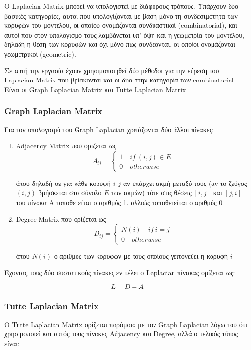 \documentclass[draft]{article}
\begin{document}
Ο Laplacian Matrix μπορεί να υπολογιστεί με διάφορους τρόπους.
Υπάρχουν δύο βασικές κατηγορίες,
αυτοί που υπολογίζονται με βάση μόνο τη συνδεσιμότητα των κορυφών του μοντέλου,
οι οποίου ονομάζονται συνδυαστικοί (combinatorial),
και αυτοί που στον υπολογισμό τους λαμβάνεται υπ' όψη και η γεωμετρία του μοντέλου,
δηλαδή η θέση των κορυφών και όχι μόνο πως συνδέονται,
οι οποίοι ονομάζονται γεωμετρικοί (geometric).

Σε αυτή την εργασία έχουν χρησιμοποιηθεί δύο μέθοδοι για την εύρεση του Laplacian Matrix
που βρίσκονται και οι δύο στην κατηγορία των combinatorial.
Είναι οι Graph Laplacian Matrix και Tutte Laplacian Matrix

\subsubsection{Graph Laplacian Matrix}
Για τον υπολογισμό του Graph Laplacian χρειάζονται δύο άλλοι πίνακες:
\begin{enumerate}
	\item Adjacency Matrix που ορίζεται ως
		\[
			A_{ij} = \begin{cases}
				1 \quad if \; (i, j) \in E \\
				0 \quad otherwise
			\end{cases}
		\]

		όπου δηλαδή σε για κάθε κορυφή $i, j$ αν υπάρχει ακμή μεταξύ τους
		(αν το ζεύγος $(i,j)$ βρήσκεται στο σύνολο $E$ των ακμών)
		τότε στις θέσεις $[i, j]$ και $[j, i]$ του πίνακα Α τοποθετείται ο αριθμός 1,
		αλλιώς τοποθετείται ο αριθμός 0

	\item Degree Matrix που ορίζεται ως
		\[
			D_{ij} = \begin{cases}
				N(i) \quad if \ i=j \\
				0 \quad otherwise
			\end{cases}
		\]

		όπου $N(i)$ ο αριθμός των κορυφών με τους οποίους γειτονεύει η κορυφή $i$
\end{enumerate}

\noindent
Έχοντας τους δύο συστατικούς πίνακες εν τέλει ο Laplacian πίνακας ορίζεται ως:

\[
	L = D - A
\]

\subsubsection{Tutte Laplacian Matrix}
Ο Tutte Laplacian Matrix ορίζεται παρόμοια με τον Graph Laplacian
λόγω του ότι χρησιμοποιεί και αυτός τους πίνακες Adjacency και Degree,
αλλά ο τελικός τύπος είναι:
\end{document}
